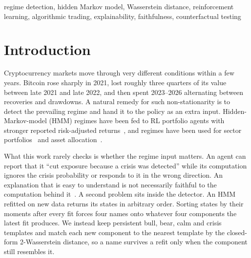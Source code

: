 \documentclass[conference]{IEEEtran}
\begin{document}
\begin{IEEEkeywords}
regime detection, hidden Markov model, Wasserstein distance, reinforcement learning, algorithmic trading, explainability, faithfulness, counterfactual testing
\end{IEEEkeywords}

\section{Introduction}
Cryptocurrency markets move through very different conditions within a few years. Bitcoin rose sharply in 2021, lost roughly three quarters of its value between late 2021 and late 2022, and then spent 2023--2026 alternating between recoveries and drawdowns. A natural remedy for such non-stationarity is to detect the prevailing regime and hand it to the policy as an extra input. Hidden-Markov-model (HMM) regimes have been fed to RL portfolio agents with stronger reported risk-adjusted returns~\cite{ndoutoumou2025hmm}, and regimes have been used for sector portfolios~\cite{zhang2025regimefolio} and asset allocation~\cite{zhang2020regimealloc}.

What this work rarely checks is whether the regime input matters. An agent can report that it ``cut exposure because a crisis was detected'' while its computation ignores the crisis probability or responds to it in the wrong direction. An explanation that is easy to understand is not necessarily faithful to the computation behind it~\cite{mamalakis2025enigma}. A second problem sits inside the detector. An HMM refitted on new data returns its states in arbitrary order. Sorting states by their moments after every fit forces four names onto whatever four components the latest fit produces. We instead keep persistent bull, bear, calm and crisis templates and match each new component to the nearest template by the closed-form 2-Wasserstein distance, so a name survives a refit only when the component still resembles it.
\end{document}
